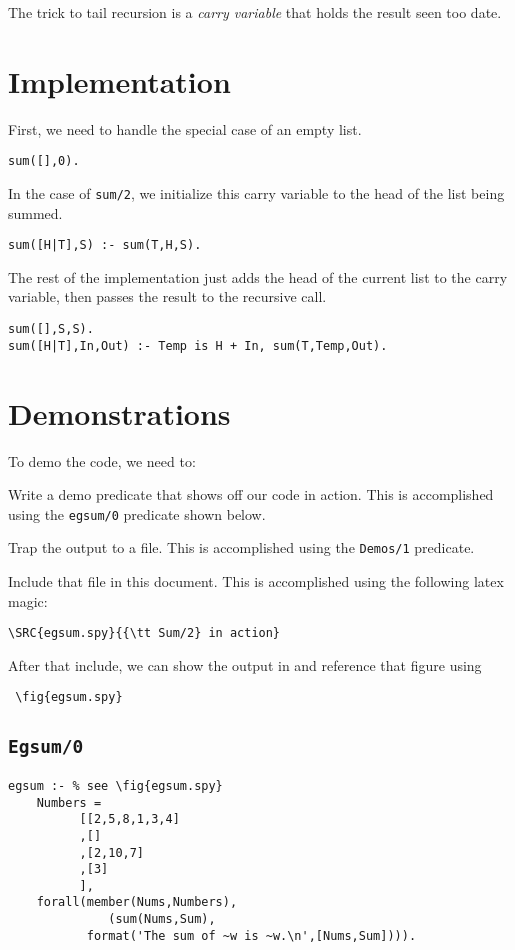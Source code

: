 \documentclass[twocolumn,global]{svjour}
\begin{document}
The trick to tail recursion is a {\em carry variable} that holds the
result seen too date.  

\section{ Implementation}
 First, we need to handle the special case of an empty list. 

\begin{Verbatim}
sum([],0).
\end{Verbatim}
 In the case of {\tt sum/2}, we initialize this 
carry variable to the head of the list being summed. 

\begin{Verbatim}
sum([H|T],S) :- sum(T,H,S).
\end{Verbatim}
 The rest of the implementation just adds the head of the
current list to the carry variable, then passes the result to
the recursive call. 

\begin{Verbatim}
sum([],S,S).
sum([H|T],In,Out) :- Temp is H + In, sum(T,Temp,Out).
\end{Verbatim}
\section{ Demonstrations}
 To demo the code, we need to:
\bi
\item Write a demo predicate that shows off our code in action.
 This is accomplished using
the {\tt egsum/0} predicate shown below. 
\item Trap the output to a file. This is accomplished using
the {\tt Demos/1} predicate.
\item Include that file in this document. This is accomplished using
the following latex magic:
\begin{verbatim}
\SRC{egsum.spy}{{\tt Sum/2} in action}
\end{verbatim}
After that include, we can show the output in 
and reference that figure using
\begin{verbatim}
 \fig{egsum.spy}
\end{verbatim}
\ei


\subsection{ {\tt Egsum/0} }
\begin{Verbatim}
egsum :- % see \fig{egsum.spy}
    Numbers = 
          [[2,5,8,1,3,4]
          ,[]
          ,[2,10,7]
          ,[3]
          ],
    forall(member(Nums,Numbers),
              (sum(Nums,Sum),
           format('The sum of ~w is ~w.\n',[Nums,Sum]))).
\end{Verbatim}
\end{document}
